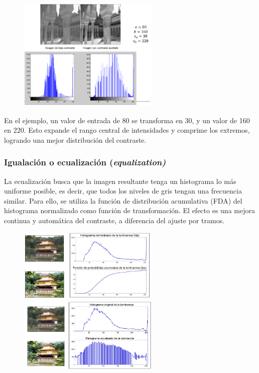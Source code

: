 \begin{figure}[h]
\centering
\includegraphics[width = 0.6\textwidth]{figs/ajuste-contraste-ej.png}
\end{figure}

En el ejemplo, un valor de entrada de 80 se transforma en 30, y un valor de 160 en 220. Esto expande el rango central de intensidades y comprime los extremos, logrando una mejor distribución del contraste.

\subsubsection{Igualación o ecualización (\textit{equalization)}}
La ecualización busca que la imagen resultante tenga un histograma lo más uniforme posible, es decir, que todos los niveles de gris tengan una frecuencia similar. Para ello, se utiliza la función de distribución acumulativa (FDA) del histograma normalizado como función de transformación. El efecto es una mejora continua y automática del contraste, a diferencia del ajuste por tramos.

\begin{figure}[h]
\centering
\includegraphics[width = 0.6\textwidth]{figs/equalization1.png}
\includegraphics[width = 0.6\textwidth]{figs/equalization.png}
\end{figure}

